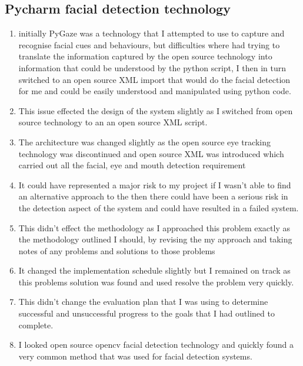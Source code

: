 \item \subsection{ \textbf{Pycharm facial detection technology } }
\begin{enumerate}																																																								\item initially PyGaze was a technology that I attempted to use to capture and recognise facial cues  and behaviours, but difficulties where had trying to translate the information captured by the open source technology into information that could be understood by the python script, I then in turn switched to an open source XML import that would do the facial detection for me and could be easily understood and manipulated using python code.
\item This issue effected the design of the system slightly as I switched from open source technology to an an open source XML script.
\item The architecture was changed slightly as the open source eye tracking technology was discontinued and open source XML  was introduced which carried out all the facial, eye and mouth detection requirement
 \item It could have represented a major risk to my project if I wasn't able to find an alternative approach to the then there could have been a serious risk in the detection aspect of the system and could have resulted in a failed system.
        \item This didn't effect the methodology as I approached this problem exactly as the methodology outlined I should, by revising the my approach and taking notes of any problems and solutions to those problems 
        \item It changed the implementation schedule slightly but I remained on track as this problems solution was found and used resolve the problem very quickly.
        \item This didn't change the evaluation plan that I was using to determine successful and unsuccessful progress to the goals that I had outlined to complete.
    \item I looked open source opencv facial detection technology and quickly found a very common method that was used for facial detection systems.
    \end{enumerate}

